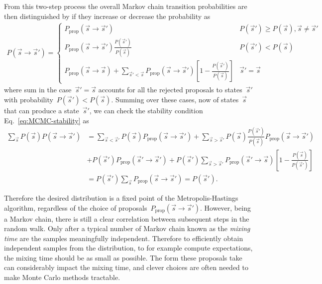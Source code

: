 From this two-step process the overall Markov chain transition probabilities are then distinguished by if they increase or decrease the probability as \begin{align}
    P(\vec{s} \rightarrow \vec{s}') = \begin{cases}
        P_{\text{prop}}(\vec{s} \rightarrow \vec{s}') & P(\vec{s}') \geq P(\vec{s}), \vec{s} \not= \vec{s}'\\
        P_{\text{prop}}(\vec{s} \rightarrow \vec{s}')\frac{P(\vec{s}')}{P(\vec{s})} & P(\vec{s}') < P(\vec{s})\\
        P_{\text{prop}}(\vec{s} \rightarrow \vec{s}) + \sum_{\vec{s}' < \vec{s}} P_{\text{prop}}(\vec{s} \rightarrow \vec{s}') \left[1 - \frac{P(\vec{s}')}{P(\vec{s})}\right]& \vec{s}' = \vec{s}
    \end{cases}
\end{align}
where sum in the case~$\vec{s}' = \vec{s}$ accounts for all the rejected proposals to states~$\vec{s}'$ with probability~$P(\vec{s}') < P(\vec{s})$. Summing over these cases, now of states~$\vec{s}$ that can produce a state~$\vec{s}'$, we can check the stability condition Eq.~\eqref{eq:MCMC-stability} as \begin{align}
    \sum_{\vec{s}} P(\vec{s})P(\vec{s} \rightarrow \vec{s}') &= \sum_{\vec{s} < \vec{s}'} P(\vec{s}) P_{\text{prop}}(\vec{s} \rightarrow \vec{s}') + \sum_{\vec{s} > \vec{s}'} P(\vec{s}) \frac{P(\vec{s}')}{P(\vec{s})}P_{\text{prop}}(\vec{s} \rightarrow \vec{s}') \nonumber\\
    &+ P(\vec{s}')P_{\text{prop}}(\vec{s}' \rightarrow \vec{s}') + P(\vec{s}') \sum_{\vec{s} > \vec{s}'} P_{\text{prop}}(\vec{s}' \rightarrow \vec{s})\left[1 - \frac{P(\vec{s})}{P(\vec{s}')}\right] \nonumber\\
    &= P(\vec{s}')\sum_{\vec{s}} P_{\text{prop}}(\vec{s} \rightarrow \vec{s}') = P(\vec{s}').
\end{align}

Therefore the desired distribution is a fixed point of the Metropolis-Hastings algorithm, regardless of the choice of proposals~$P_{\text{prop}}(\vec{s} \rightarrow \vec{s}')$. However, being a Markov chain, there is still a clear correlation between subsequent steps in the random walk. Only after a typical number of Markov chain known as the \emph{mixing time} are the samples meaningfully independent. Therefore to efficiently obtain independent samples from the distribution, to for example compute expectations, the mixing time should be as small as possible. The form these proposals take can considerably impact the mixing time, and clever choices are often needed to make Monte Carlo methods tractable.


